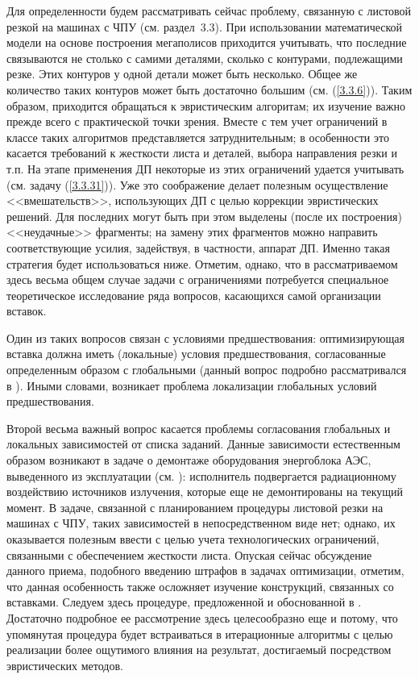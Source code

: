 \documentclass[11pt,twoside,openany]{report}
\begin{document}
{Для определенности будем рассматривать сейчас проблему, связанную с
листовой резкой на машинах с ЧПУ (см. раздел~3.3). При использовании
математической модели на основе построения мегаполисов приходится учитывать,
что последние связываются не столько с самими деталями, сколько с контурами,
подлежащими резке. Этих контуров у одной детали может быть несколько.
Общее же количество таких контуров может быть достаточно большим
(см. (\ref{3.3.6})). Таким образом, приходится обращаться к эвристическим
алгоритам; их изучение важно прежде всего с практической точки зрения.
Вместе с тем учет ограничений в классе таких алгоритмов представляется
затруднительным; в особенности это касается требований к жесткости листа
и деталей, выбора направления резки и т.п. На этапе применения ДП некоторые
из этих ограничений удается учитывать (см. задачу (\ref{3.3.31})).  Уже это
соображение делает полезным осуществление <<вмешательств>>, использующих ДП
с целью коррекции эвристических решений. Для последних могут быть при этом
выделены (после их построения) <<неудачные>> фрагменты; на замену этих
фрагментов можно направить соответствующие  усилия, задействуя, в частности,
аппарат ДП. Именно такая стратегия будет использоваться ниже. Отметим,
однако, что в рассматриваемом здесь весьма общем случае задачи с ограничениями
потребуется специальное теоретическое исследование ряда вопросов, касающихся
самой организации вставок.

Один из таких вопросов  связан с условиями предшествования: оптимизирующая
вставка должна иметь (локальные) условия предшествования, согласованные
определенным образом с глобальными (данный вопрос подробно рассматривался
в \cite{Cha14`}). Иными словами, возникает проблема локализации глобальных
условий предшествования.

Второй весьма важный вопрос касается проблемы согласования глобальных и
локальных зависимостей от списка заданий. Данные зависимости естественным
образом возникают в задаче о демонтаже оборудования энергоблока АЭС,
выведенного из эксплуатации (см. \cite{Cha2`}): исполнитель подвергается
радиационному воздействию источников излучения, которые еще не демонтированы
на текущий момент. В задаче, связанной с планированием процедуры листовой
резки на машинах с ЧПУ, таких зависимостей в непосредственном виде нет;
однако, их оказывается полезным ввести с целью учета технологических
ограничений, связанными с обеспечением жесткости листа. Опуская сейчас
обсуждение данного приема, подобного введению штрафов в задачах оптимизации,
отметим, что данная особенность также осложняет изучение конструкций,
связанных со вставками. Следуем здесь процедуре, предложенной и обоснованной
в \cite{Cha13`}. Достаточно подробное ее рассмотрение здесь целесообразно
еще и потому, что упомянутая процедура будет встраиваться в итерационные
алгоритмы с целью реализации более ощутимого влияния на результат,
достигаемый посредством эвристических методов.


}
\end{document}
